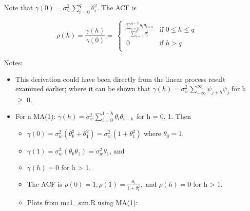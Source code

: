 \documentclass[
]{book}
\providecommand{\tightlist}{%
  \setlength{\itemsep}{0pt}\setlength{\parskip}{0pt}}
\theoremstyle{definition}
\theoremstyle{definition}
\theoremstyle{definition}
\theoremstyle{definition}
\theoremstyle{remark}
\begin{document}
Note that \(\gamma(0)=\sigma_w^2\sum_{i=0}^{q}\theta_i^2.\) The ACF is

\[
\rho(h)=\frac{\gamma(h)}{\gamma(0)}=\
\begin{cases}
    \frac{\sum_{i=0}^{q-h}\theta_i\theta_{i+h}}{\sum_{i=0}^{q}\theta_i^2} & \text{if } 0 \le h \le q \\
    \ 0 & \text{if } h>q \\
\end{cases}
\]

Notes:

\begin{itemize}
\item
  This derivation could have been directly from the linear process result examined earlier; where it can be shown that \(\gamma(h)=\sigma_w^2\sum_{-\infty}^{\infty}\psi_{j+h}\psi_j\) for h \(\ge\) 0.
\item
  For a MA(1): \(\gamma(h)=\sigma_w^2\sum_{i=0}^{1-h}\theta_i\theta_{i-h}\) for h = 0, 1. Then

  \begin{itemize}
  \tightlist
  \item
    \(\gamma(0) =\sigma_w^2(\theta_0^2+\theta_1^2)=\sigma_w^2(1+\theta_1^2)\) where \(\theta_0 = 1\),
  \item
    \(\gamma(1) =\sigma_w^2(\theta_0\theta_1)=\sigma_w^2\theta_1\), and\\
  \item
    \(\gamma(h) = 0\) for h \textgreater{} 1.\\
  \item
    The ACF is \(\rho(0) = 1, \rho(1) =\frac{\theta_1}{1+\theta_1^2},\) and \(\rho(h) = 0\) for h \textgreater{} 1.\\
  \item
    Plots from ma1\_sim.R using MA(1):
  \end{itemize}
\end{itemize}
\end{document}
